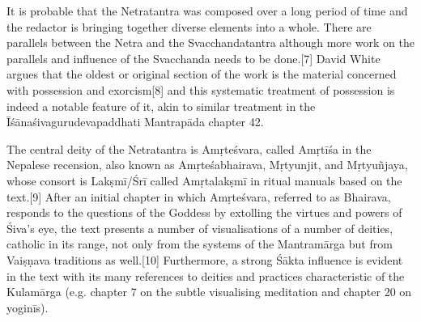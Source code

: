 {It is probable that the Netratantra was composed over a long period of time and the redactor is bringing together diverse elements into a whole. There are parallels between the Netra and the Svacchandatantra although more work on the parallels and influence of the Svacchanda needs to be done.[7] David White argues that the oldest or original section of the work is the material concerned with possession and exorcism[8] and this systematic treatment of possession is indeed a notable feature of it, akin to similar treatment in the Īśānaśivagurudevapaddhati Mantrapāda chapter 42.

The central deity of the Netratantra is Amṛteśvara, called Amṛtīśa in the Nepalese recension, also known as Amṛteśabhairava, Mṛtyunjit, and Mṛtyuñjaya, whose consort is Lakṣmī/Śrī called Amṛtalakṣmī in ritual manuals based on the text.[9] After an initial chapter in which Amṛteśvara, referred to as Bhairava, responds to the questions of the Goddess by extolling the virtues and powers of Śiva’s eye, the text presents a number of visualisations of a number of deities, catholic in its range, not only from the systems of the Mantramārga but from Vaiṣṇava traditions as well.[10] Furthermore, a strong Śākta influence is evident in the text with its many references to deities and practices characteristic of the Kulamārga (e.g. chapter 7 on the subtle visualising meditation and chapter 20 on yoginīs).

}
